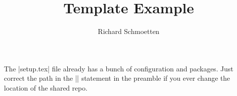 \documentclass[]{article}
\title{Template Example}
\author{Richard Schmoetten}
\begin{document}
\maketitle

The \lisa|setup.tex| file already has a bunch of configuration and packages. Just correct the path in the \lisa|| statement in the preamble if you ever change the location of the shared repo.


\printbibliography
\end{document}

